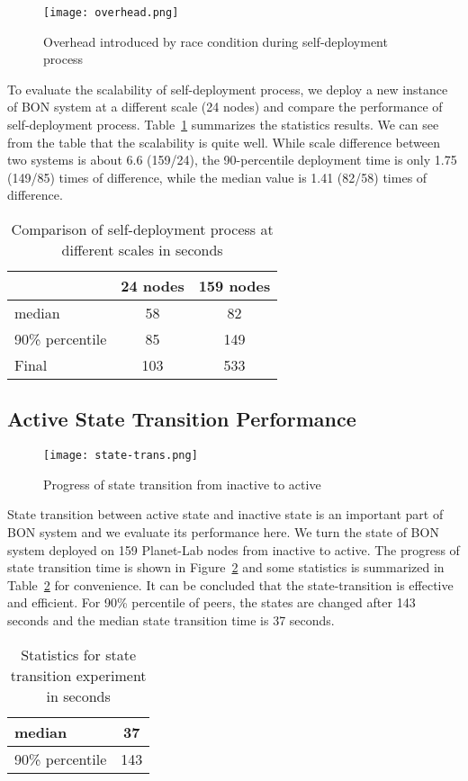 \begin{figure}
\centering
\texttt{[image: overhead.png]}
\caption{Overhead introduced by race condition during
self-deployment process}
\label{fig:overhead}
\end{figure}


To evaluate the scalability of self-deployment process, we deploy
a new instance of BON system at a different scale (24 nodes) and
compare the performance of self-deployment process.
Table~\ref{tbl:scalability} summarizes the statistics results.
We can see from the table that the scalability is quite well.
While scale difference between two systems is about 6.6 (159/24), the
90-percentile deployment time is only 1.75 (149/85) times of
difference, while the median value is 1.41 (82/58) times of
difference.

\begin{table}
\centering
\begin{tabular}{|l|c|c|}
\hline
  & 24 nodes & 159 nodes\\
\hline
median & 58 & 82 \\
\hline
90\% percentile & 85 & 149 \\
\hline
Final & 103 & 533 \\
\hline
\end{tabular}
\caption{Comparison of self-deployment process at different scales in seconds}
\label{tbl:scalability}
\end{table}

\subsection{Active State Transition Performance}

\begin{figure}
\centering
\texttt{[image: state-trans.png]}
\caption{Progress of state transition from inactive to active}
\label{fig:state-transition}
\end{figure}

State transition between active state and inactive state
is an important part of BON system and we evaluate its
performance here. We turn the state of BON system deployed on 159
Planet-Lab nodes from inactive to active.
The progress of state transition time is shown in
Figure~\ref{fig:state-transition} and some statistics is
summarized in Table~\ref{tbl:state-transition} for convenience. It can be
concluded that the
state-transition is effective and efficient. For 90\% percentile
of peers, the states are changed after 143 seconds and the
median state transition time is 37 seconds.


\begin{table}
\centering
\begin{tabular}{|l|c|}
\hline
median & 37 \\
\hline
90\% percentile & 143 \\
\hline
\end{tabular}
\caption{Statistics for state transition experiment in seconds}
\label{tbl:state-transition}
\end{table}

